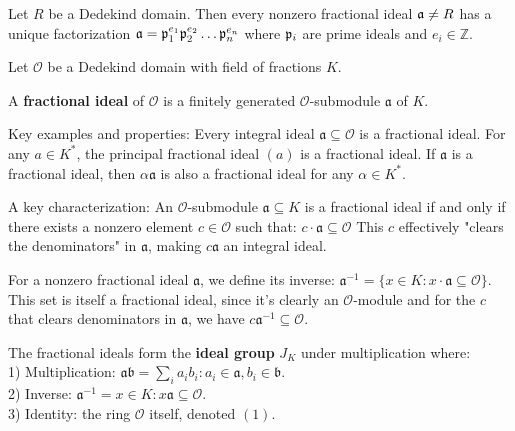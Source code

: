 \begin{outline}
\0 \begin{theorem}
Let $R$ be a Dedekind domain. Then every nonzero fractional ideal $\mathfrak{a} \neq R$ has a unique factorization $\mathfrak{a}=\mathfrak{p}_1^{e_1}\mathfrak{p}_2^{e_2}\ldots \mathfrak{p}_n^{e_n}$ where $\mathfrak{p}_i$ are prime ideals and $e_i \in \mathbb{Z}$.
\end{theorem}

Let $\mathcal{O}$ be a Dedekind domain with field of fractions $K$.

\begin{definition}
A \textbf{fractional ideal} of $\mathcal{O}$ is a finitely generated $\mathcal{O}$-submodule $\mathfrak{a}$ of $K$.
\end{definition}

\1 Key examples and properties:
    \2 Every integral ideal $\mathfrak{a} \subseteq \mathcal{O}$ is a fractional ideal.
    \2 For any $a \in K^*$, the principal fractional ideal $(a)$ is a fractional ideal.
    \2 If $\mathfrak{a}$ is a fractional ideal, then $\alpha \mathfrak{a}$ is also a fractional ideal for any $\alpha \in K^*$.

\1 A key characterization: An $\mathcal{O}$-submodule $\mathfrak{a} \subseteq K$ is a fractional ideal if and only if there exists a nonzero element $c \in \mathcal{O}$ such that: $c \cdot \mathfrak{a} \subseteq \mathcal{O}$
This $c$ effectively "clears the denominators" in $\mathfrak{a}$, making $c\mathfrak{a}$ an integral ideal.

\1 For a nonzero fractional ideal $\mathfrak{a}$, we define its inverse:
$\mathfrak{a}^{-1} = \{x \in K : x\cdot \mathfrak{a} \subseteq \mathcal{O}\}$.
This set is itself a fractional ideal, since it's clearly an $\mathcal{O}$-module and for the $c$ that clears denominators in $\mathfrak{a}$, we have $c\mathfrak{a}^{-1} \subseteq \mathcal{O}$.

\0 \begin{definition}
The fractional ideals form the \textbf{ideal group} $J_K$ under multiplication where:\\
    1) Multiplication: $\mathfrak{a}\mathfrak{b} = {\sum_{i} a_ib_i : a_i \in \mathfrak{a}, b_i \in \mathfrak{b}}$.\\
    2) Inverse: $\mathfrak{a}^{-1} = {x \in K : x\mathfrak{a} \subseteq \mathcal{O}}$.\\
    3) Identity: the ring $\mathcal{O}$ itself, denoted $(1)$.
\end{definition}


\end{outline}
